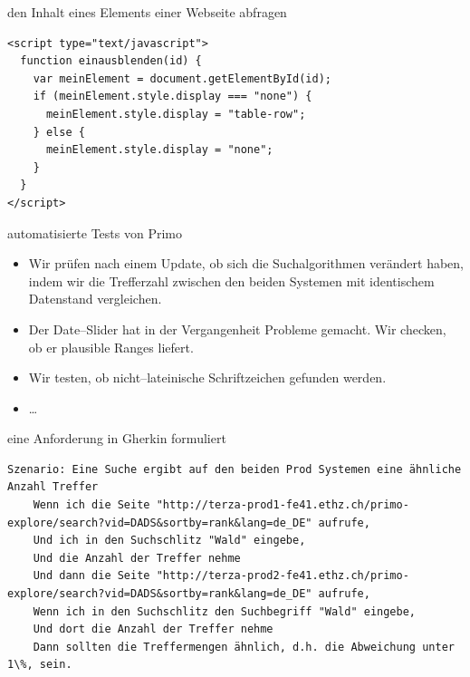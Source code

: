 \begin{frame}[fragile]{den Inhalt eines Elements einer Webseite abfragen}
  \selectfont
  \begin{lstlisting}
<script type="text/javascript">
  function einausblenden(id) {
    var meinElement = document.getElementById(id);
    if (meinElement.style.display === "none") {
      meinElement.style.display = "table-row";
    } else {
      meinElement.style.display = "none";
    }
  }
</script>
  \end{lstlisting}
\end{frame}


\begin{frame}[<+->]{automatisierte Tests von Primo}
  \begin{itemize}
    \item Wir prüfen nach einem Update, ob sich die Suchalgorithmen verändert haben, indem wir die Trefferzahl zwischen den beiden Systemen mit identischem Datenstand vergleichen.
    \item Der Date--Slider hat in der Vergangenheit Probleme gemacht. Wir checken, ob er plausible Ranges liefert.
    \item Wir testen, ob nicht--lateinische Schriftzeichen gefunden werden.
    \item \ldots
  \end{itemize}
\end{frame}


\begin{frame}[fragile]{eine Anforderung in Gherkin formuliert}
  \selectfont
  \begin{lstlisting}
Szenario: Eine Suche ergibt auf den beiden Prod Systemen eine ähnliche Anzahl Treffer
    Wenn ich die Seite "http://terza-prod1-fe41.ethz.ch/primo-explore/search?vid=DADS&sortby=rank&lang=de_DE" aufrufe,
    Und ich in den Suchschlitz "Wald" eingebe,
    Und die Anzahl der Treffer nehme
    Und dann die Seite "http://terza-prod2-fe41.ethz.ch/primo-explore/search?vid=DADS&sortby=rank&lang=de_DE" aufrufe,
    Wenn ich in den Suchschlitz den Suchbegriff "Wald" eingebe,
    Und dort die Anzahl der Treffer nehme
    Dann sollten die Treffermengen ähnlich, d.h. die Abweichung unter 1\%, sein.
  \end{lstlisting}
\end{frame}

